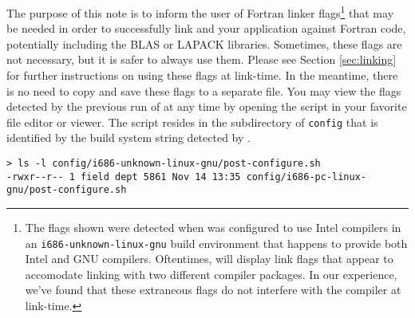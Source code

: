 The purpose of this note is to inform the user of Fortran linker flags\footnote{
The flags shown were detected when \libflame was configured to use Intel
compilers in an {\tt i686-unknown-linux-gnu} build environment that
happens to provide both Intel and GNU compilers.
Oftentimes, \postconfigure will display link flags that appear to accomodate
linking with two different compiler packages.
In our experience, we've found that these extraneous flags do not interfere
with the compiler at link-time.
}
that may be needed in order
to successfully link \libflame and your application against Fortran code,
potentially including the BLAS or LAPACK libraries.
Sometimes, these flags are not necessary, but it is safer to always use them.
Please see Section \ref{sec:linking} for further instructions on using these
flags at link-time.
In the meantime, there is no need to copy and save these flags to a separate
file.
You may view the flags detected by the previous run of \configure at
any time by opening the \postconfigure script in your favorite file editor
or viewer.
The \postconfigure script resides in the subdirectory of {\tt config} that
is identified by the build system string detected by \configurens.

\begin{Verbatim}[frame=single,framesep=2.5mm,xleftmargin=5mm,commandchars=\\\{\},fontsize=\footnotesize]
> ls -l config/i686-unknown-linux-gnu/post-configure.sh 
-rwxr--r-- 1 field dept 5861 Nov 14 13:35 config/i686-pc-linux-gnu/post-configure.sh
\end{Verbatim}





